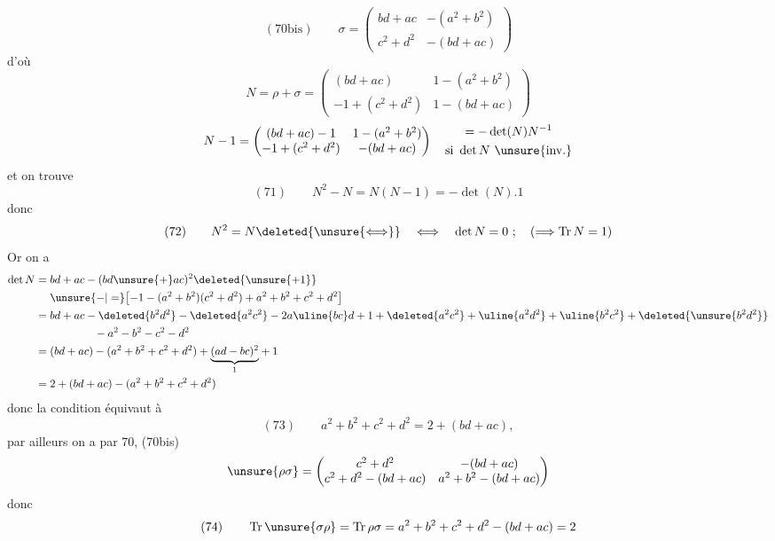\[
(70\mathrm{bis})\qquad
\sigma=\begin{pmatrix}
bd+ac&-(a^2+b^2)\\
c^2+d^2&-(bd+ac)
\end{pmatrix}
\]
d'où
\[
N=\rho+\sigma=\begin{pmatrix}
(bd+ac)&1-(a^2+b^2)\\
-1+(c^2+d^2)&1-(bd+ac)
\end{pmatrix}
\]
\[
N-1=\begin{pmatrix}
(bd+ac)-1&1-(a^2+b^2)\\
-1+(c^2+d^2)&-(bd+ac)
\end{pmatrix}
\quad\begin{gathered}
=-\det(N)N^{-1}\\
\text{si }\det N\text{ \unsure{inv.}}
\end{gathered}
\]
et on trouve
\[
(71)\qquad N^2-N=N(N-1)=-\det(N).1
\]
donc 
\[
(72)\qquad N^2=N\deleted{\unsure{\Longleftrightarrow}}\quad\Longleftrightarrow\quad\det N=0\ ;\quad(\Longrightarrow\operatorname{Tr}N=1)
\]
Or on a
\[
\begin{aligned}
\det N={}&bd+ac-(bd\unsure{+}ac)^2\deleted{\unsure{+1}}\\
&\unsure{-|=}\bigl[-1-(a^2+b^2)(c^2+d^2)+a^2+b^2+c^2+d^2\bigr]\\
={}&bd+ac-\deleted{b^2d^2}-\deleted{a^2c^2}-2a\uline{bc}d+1
+\deleted{a^2c^2}+\uline{a^2d^2}+\uline{b^2c^2}+\deleted{\unsure{b^2d^2}}\\
&\hspace{4em}-a^2-b^2-c^2-d^2\\
={}&(bd+ac)-(a^2+b^2+c^2+d^2)+\underset{1}{\underbrace{(ad-bc)^2}}+1\\
={}&2+(bd+ac)-(a^2+b^2+c^2+d^2)
\end{aligned}
\]
donc la condition  équivaut à
\[
(73)\qquad a^2+b^2+c^2+d^2=2+(bd+ac),
\]
par ailleurs on a par 70, (70bis)
\[
\unsure{\rho\sigma}=\begin{pmatrix}
c^2+d^2&-(bd+ac)\\
c^2+d^2-(bd+ac)&a^2+b^2-(bd+ac)
\end{pmatrix}
\]
donc
\[
(74)\qquad \operatorname{Tr}\unsure{\sigma\rho}=\operatorname{Tr}\rho\sigma
=a^2+b^2+c^2+d^2-(bd+ac)=2
\]
